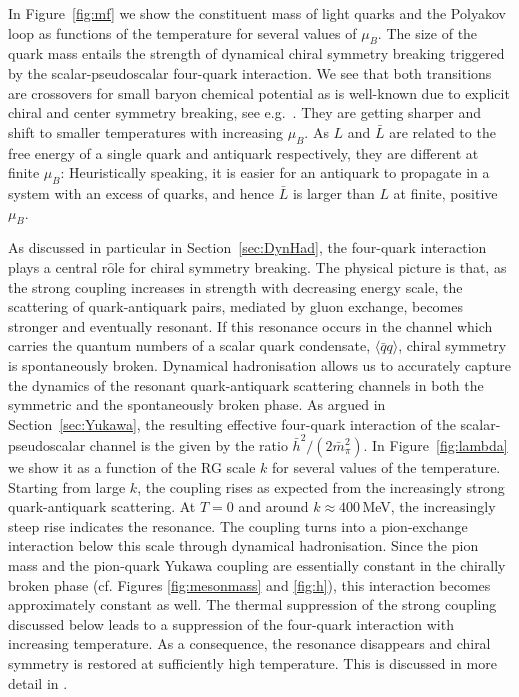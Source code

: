\documentclass[%
reprint,
superscriptaddress,
showpacs,preprintnumbers,
 amsmath,amssymb,
 aps,
prd,
]{revtex4-1}
\def\Fig#1{Figure~\ref{#1}}
\def\sec#1{Section~\ref{#1}}
\begin{document}
In \Fig{fig:mf} we show the constituent mass of light quarks and the
Polyakov loop as functions of the temperature for several values of
$\mu_B$. The size of the quark mass entails the strength of dynamical
chiral symmetry breaking triggered by the scalar-pseudoscalar
four-quark interaction. We see that both transitions are crossovers
for small baryon chemical potential as is well-known due to explicit
chiral and center symmetry breaking, see e.g.\
\cite{Aoki:2006we}. They are getting sharper and shift to smaller
temperatures with increasing $\mu_B$. As $L$ and $\bar L$ are related
to the free energy of a single quark and antiquark respectively, they
are different at finite $\mu_B$: Heuristically speaking, it is easier
for an antiquark to propagate in a system with an excess of quarks,
and hence $\bar L$ is larger than $L$ at finite, positive $\mu_B$.

As discussed in particular in \sec{sec:DynHad}, the four-quark
interaction plays a central r$\hat{\textrm{o}}$le for chiral symmetry
breaking. The physical picture is that, as the strong coupling
increases in strength with decreasing energy scale, the scattering of
quark-antiquark pairs, mediated by gluon exchange, becomes stronger
and eventually resonant. If this resonance occurs in the channel which
carries the quantum numbers of a scalar quark condensate,
$\langle \bar q q \rangle$, chiral symmetry is spontaneously
broken. Dynamical hadronisation allows us to accurately capture the
dynamics of the resonant quark-antiquark scattering channels in both
the symmetric and the spontaneously broken phase. As argued in
\sec{sec:Yukawa}, the resulting effective four-quark interaction of
the scalar-pseudoscalar channel is the given by the ratio
$\bar h^2/(2\bar m_\pi^2)$. In \Fig{fig:lambda} we show it as a
function of the RG scale $k$ for several values of the
temperature. Starting from large $k$, the coupling rises as expected
from the increasingly strong quark-antiquark scattering. At $T = 0$
and around $k \approx 400$\,MeV, the increasingly steep rise indicates
the resonance. The coupling turns into a pion-exchange interaction
below this scale through dynamical hadronisation. Since the pion mass
and the pion-quark Yukawa coupling are essentially constant in the
chirally broken phase (cf. Figures \ref{fig:mesonmass} and
\ref{fig:h}), this interaction becomes approximately constant as
well. The thermal suppression of the strong coupling discussed below
leads to a suppression of the four-quark interaction with increasing
temperature. As a consequence, the resonance disappears and chiral
symmetry is restored at sufficiently high temperature. This is
discussed in more detail in \cite{Braun:2006jd}.
\end{document}
